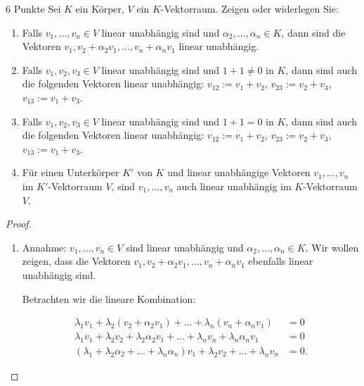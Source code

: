 \documentclass{problemset}
\begin{document}
\begin{problem}{6 Punkte}
Sei $K$ ein Körper, $V$ ein $K$-Vektorraum. Zeigen oder widerlegen Sie:
\begin{enumerate}
    \item Falls $v_1, \ldots, v_n \in V$ linear unabhängig sind und $\alpha_2, \ldots,
              \alpha_n \in K$, dann sind die Vektoren $v_1, v_2 + \alpha_2v_1, \ldots, v_n +
              \alpha_nv_1$ linear unabhängig.
    \item Falls $v_1, v_2, v_3 \in V$ linear unabhängig sind und $1 + 1 \neq 0$ in $K$,
          dann sind auch die folgenden Vektoren linear unabhängig: $v_{12} := v_1 + v_2$,
          $v_{23} := v_2 + v_3$, $v_{13} := v_1 + v_3$.
    \item Falls $v_1, v_2, v_3 \in V$ linear unabhängig sind und $1 + 1 = 0$ in $K$, dann
          sind auch die folgenden Vektoren linear unabhängig: $v_{12} := v_1 + v_2$,
          $v_{23} := v_2 + v_3$, $v_{13} := v_1 + v_3$.
    \item Für einen Unterkörper $K'$ von $K$ und linear unabhängige Vektoren $v_1,
              \ldots, v_n$ im $K'$-Vektorraum $V$, sind $v_1, \ldots, v_n$ auch linear
          unabhängig im $K$-Vektorraum $V$.
\end{enumerate}
\begin{proof}
    $ $

    \begin{enumerate}
        \item Annahme: $v_1, \ldots, v_n \in V$ sind linear unabhängig und $\alpha_2, \ldots,
                  \alpha_n \in K$. Wir wollen zeigen, dass die Vektoren $v_1, v_2 + \alpha_2v_1,
                  \ldots, v_n + \alpha_nv_1$ ebenfalls linear unabhängig sind.

              Betrachten wir die lineare Kombination:

              \begin{align*}
                  \lambda_1 v_1 + \lambda_2 (v_2 + \alpha_2 v_1) + \ldots + \lambda_n (v_n + \alpha_n v_1)               & = 0  \\
                  \lambda_1 v_1 + \lambda_2v_2 + \lambda_2\alpha_2v_1 + \ldots + \lambda_nv_n + \lambda_n\alpha_nv_1     & = 0  \\
                  (\lambda_1 + \lambda_2\alpha_2 + \ldots + \lambda_n\alpha_n)v_1 + \lambda_2v_2 + \ldots + \lambda_nv_n & = 0.
              \end{align*}


\end{enumerate}
\end{proof}
\end{problem}
\end{document}
